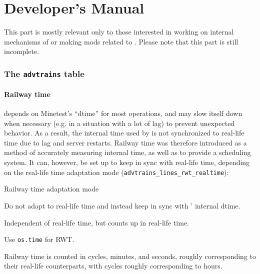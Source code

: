 \part{Developer's Manual}

This part is mostly relevant only to those interested in working on internal mechanisms of \advtrains{} or making mods related to \advtrains{}. Please note that this part is still incomplete.

\section{The \texttt{advtrains} table}\label{s:tadvtrains}

\subsection{Railway time}\label{s:tilrwt}
\advtrains{} depends on Minetest's ``dtime'' for most operations, and may slow itself down when necessary (e.g. in a situation with a lot of lag) to prevent unexpected behavior. As a result, the internal time used by \advtrains{} is not synchronized to real-life time due to lag and server restarts. Railway time was therefore introduced as a method of accurately measuring internal time, as well as to provide a scheduling system. It can, however, be set up to keep in sync with real-life time, depending on the real-life time adaptation mode (\texttt{advtrains\_lines\_rwt\_realtime}):
\begin{apidoc}{Railway time adaptation mode}
\item {} Do not adapt to real-life time and instead keep in sync with \advtrains{}' internal dtime.
\item {} Independent of real-life time, but counts up in real-life time.
\item {} Use \texttt{os.time} for RWT.
\end{apidoc}

Railway time is counted in cycles, minutes, and seconds, roughly corresponding to their real-life counterparts, with cycles roughly corresponding to hours.

